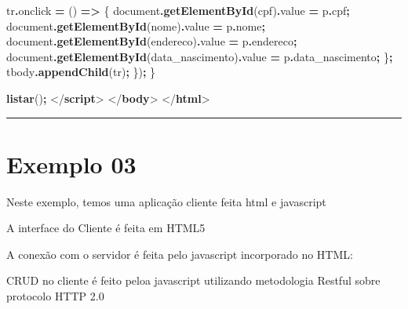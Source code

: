 \documentclass[
]{book}
\newenvironment{Shaded}{\begin{snugshade}}{\end{snugshade}}
\newcommand{\AttributeTok}[1]{\textcolor[rgb]{0.13,0.29,0.53}{#1}}
\newcommand{\BuiltInTok}[1]{#1}
\newcommand{\DataTypeTok}[1]{\textcolor[rgb]{0.13,0.29,0.53}{#1}}
\newcommand{\FunctionTok}[1]{\textcolor[rgb]{0.13,0.29,0.53}{\textbf{#1}}}
\newcommand{\KeywordTok}[1]{\textcolor[rgb]{0.13,0.29,0.53}{\textbf{#1}}}
\newcommand{\NormalTok}[1]{#1}
\newcommand{\OperatorTok}[1]{\textcolor[rgb]{0.81,0.36,0.00}{\textbf{#1}}}
\newcommand{\StringTok}[1]{\textcolor[rgb]{0.31,0.60,0.02}{#1}}
\begin{document}
\begin{Shaded}
\begin{Highlighting}[]
\NormalTok{    tr}\OperatorTok{.}\AttributeTok{onclick} \OperatorTok{=}\NormalTok{ () }\KeywordTok{=\textgreater{}}\NormalTok{ \{}
      \BuiltInTok{document}\OperatorTok{.}\FunctionTok{getElementById}\NormalTok{(}\StringTok{\textquotesingle{}cpf\textquotesingle{}}\NormalTok{)}\OperatorTok{.}\AttributeTok{value} \OperatorTok{=}\NormalTok{ p}\OperatorTok{.}\AttributeTok{cpf}\OperatorTok{;}
      \BuiltInTok{document}\OperatorTok{.}\FunctionTok{getElementById}\NormalTok{(}\StringTok{\textquotesingle{}nome\textquotesingle{}}\NormalTok{)}\OperatorTok{.}\AttributeTok{value} \OperatorTok{=}\NormalTok{ p}\OperatorTok{.}\AttributeTok{nome}\OperatorTok{;}
      \BuiltInTok{document}\OperatorTok{.}\FunctionTok{getElementById}\NormalTok{(}\StringTok{\textquotesingle{}endereco\textquotesingle{}}\NormalTok{)}\OperatorTok{.}\AttributeTok{value} \OperatorTok{=}\NormalTok{ p}\OperatorTok{.}\AttributeTok{endereco}\OperatorTok{;}
      \BuiltInTok{document}\OperatorTok{.}\FunctionTok{getElementById}\NormalTok{(}\StringTok{\textquotesingle{}data\_nascimento\textquotesingle{}}\NormalTok{)}\OperatorTok{.}\AttributeTok{value} \OperatorTok{=}\NormalTok{ p}\OperatorTok{.}\AttributeTok{data\_nascimento}\OperatorTok{;}
\NormalTok{    \}}\OperatorTok{;}
\NormalTok{    tbody}\OperatorTok{.}\FunctionTok{appendChild}\NormalTok{(tr)}\OperatorTok{;}
\NormalTok{  \})}\OperatorTok{;}
\NormalTok{\}}

\FunctionTok{listar}\NormalTok{()}\OperatorTok{;}
\DataTypeTok{\textless{}/}\KeywordTok{script}\DataTypeTok{\textgreater{}}
\DataTypeTok{\textless{}/}\KeywordTok{body}\DataTypeTok{\textgreater{}}
\DataTypeTok{\textless{}/}\KeywordTok{html}\DataTypeTok{\textgreater{}}
\end{Highlighting}
\end{Shaded}

\begin{center}\rule{0.5\linewidth}{0.5pt}\end{center}

\section{Exemplo 03}\label{exemplo-03}

Neste exemplo, temos uma aplicação cliente feita html e javascript

A interface do Cliente é feita em HTML5

A conexão com o servidor é feita pelo javascript incorporado no HTML:

CRUD no cliente é feito peloa javascript utilizando metodologia Restful sobre protocolo HTTP 2.0
\end{document}
